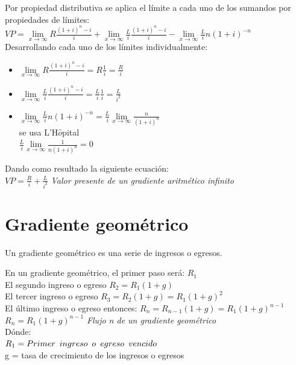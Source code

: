	Por propiedad distributiva se aplica el límite a cada uno de los sumandos por propiedades de límites:\\
	
$VP = \lim\limits_{x \to \infty} R\frac{(1+i)^n-i}{i} + \lim\limits_{x \to \infty} \frac{L}{i}\frac{(1+i)^n-i}{i} - \lim\limits_{x \to \infty} \frac{L}{i}n(1+i)^{-n}$\\

	Desarrollando cada uno de los límites individualmente:
	
	\begin{itemize}
		\item $\lim\limits_{x \to \infty} R\frac{(1+i)^n-i}{i} = R\frac{1}{i} = \frac{R}{i} $\\
		\item $\lim\limits_{x \to \infty} \frac{L}{i}\frac{(1+i)^n-i}{i} = \frac{L}{i} \frac{1}{i} = \frac{L}{i^2} $\\
		\item $\lim\limits_{x \to \infty} \frac{L}{i}n(1+i)^{-n} = \frac{L}{i} \lim\limits_{x \to \infty} \frac{n}{(1+i)^{n}} $\\
		      se usa L'H$\hat{o}$pital \\
		      $ \frac{L}{i} \lim\limits_{x \to \infty} \frac{1}{n(1+i)^{n}} = 0 $\\
	\end{itemize}
	
	Dando como resultado la siguiente ecuación:\\
	
$VP = \frac{R}{i} + \frac{L}{i^2}$ \hspace{35pt} \textit{Valor presente de un gradiente aritmético infinito}\\

		\section{Gradiente geométrico}
	Un gradiente geométrico es una serie de ingresos o egresos.
	
	En un gradiente geométrico, el primer paso será: $R_{1}$\\
	El segundo ingreso o egreso $R_{2} = R_{1}(1+g)$\\
	El tercer ingreso o egreso $R_{3} = R_{2}(1 + g) = R_{1}(1 + g)^{2}$\\
	El último ingreso o egreso entonces: $R_{n} = R_{n-1}(1+g) = R_{1}(1+g)^{n-1}$\\
$R_{n} = R_{1}(1+g)^{n-1}$ \hspace{35 pt} \textit{Flujo n de un gradiente geométrico}\\
	Dónde:\\
$R_{1} = Primer \hspace{5 pt} ingreso \hspace{5 pt} o \hspace{5 pt} egreso \hspace{5 pt} vencido$\\
g = tasa de crecimiento de los ingresos o egresos\\

